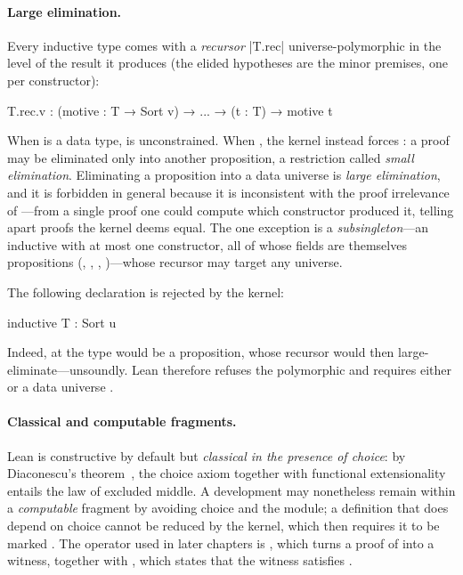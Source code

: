 \paragraph{Large elimination.}
\label{par:large-elimination}
Every inductive type  comes with a \emph{recursor} \leaninl|T.rec|
universe-polymorphic in the level  of the result it produces (the elided
hypotheses are the minor premises, one per constructor):
\begin{leanlisting}
T.rec.{v} : (motive : T → Sort v) → ... → (t : T) → motive t
\end{leanlisting}
When  is a data type,  is unconstrained.
When , the kernel instead
forces : a proof may be eliminated only into another proposition, a
restriction called \emph{small elimination}. Eliminating a proposition into a data
universe is \emph{large elimination}, and it is forbidden in general because it is
inconsistent with the proof irrelevance of ---from a single proof one
could compute which constructor produced it, telling apart proofs the kernel deems
equal. The one exception is a \emph{subsingleton}---an inductive with at most one
constructor, all of whose fields are themselves propositions (,
, , \etc)---whose recursor may target any universe.

\begin{example}
\label{ex:large-elimination}
The following declaration is rejected by the kernel:
\begin{leanlisting}
inductive T : Sort u
\end{leanlisting}
Indeed, at  the type  would be a proposition,
whose recursor would then large-eliminate---unsoundly. Lean therefore
refuses the polymorphic  and requires either 
or a data universe .
\end{example}

\paragraph{Classical and computable fragments.}
Lean is constructive by default but \emph{classical in the presence of choice}:
by Diaconescu's theorem~\cite{diaconescu1975}, the choice axiom together with
functional extensionality entails the law of excluded middle. A development may
nonetheless remain within a \emph{computable} fragment by avoiding choice and the
 module; a definition that does depend on choice cannot be
reduced by the kernel, which then requires it to be marked .
The operator used in later chapters is , which turns a proof of
 into a witness, together with , which
states that the witness satisfies .

